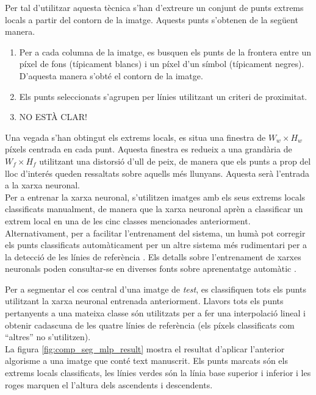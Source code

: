 Per tal d'utilitzar aquesta tècnica s'han d'extreure un conjunt de punts extrems locals a partir del contorn de la imatge. Aquests punts s'obtenen de la següent manera.
\begin{enumerate}
\item Per a cada columna de la imatge, es busquen els punts de la frontera entre un píxel de fons (típicament blancs) i un píxel d'un símbol (típicament negres). D'aquesta manera s'obté el contorn de la imatge.
\item Els punts seleccionats s'agrupen per línies utilitzant un criteri de proximitat.
\item NO ESTÀ CLAR!
\end{enumerate}

Una vegada s'han obtingut els extrems locals, es situa una finestra de $W_w \times H_w$ píxels centrada en cada punt. Aquesta finestra es redueix a una grandària de $W_f \times H_f$ utilitzant una distorsió d'ull de peix, de manera que els punts a prop del lloc d'interés queden ressaltats sobre aquells més llunyans. Aquesta serà l'entrada a la xarxa neuronal.\\

Per a entrenar la xarxa neuronal, s'utilitzen imatges amb els seus extrems locals classificats manualment, de manera que la xarxa neuronal aprèn a classificar un extrem local en una de les cinc classes mencionades anteriorment. Alternativament, per a facilitar l'entrenament del sistema, un humà pot corregir els punts classificats automàticament per un altre sistema més rudimentari per a la detecció de les línies de referència \cite{DBLP:conf/pris/Gorbe-MoyaEZB08}. Els detalls sobre l'entrenament de xarxes neuronals poden consultar-se en diverses fonts sobre aprenentatge automàtic \cite{DH73,bishop2006pattern,murphy2012machine}.

Per a segmentar el cos central d'una imatge de \emph{test}, es classifiquen tots els punts utilitzant la xarxa neuronal entrenada anteriorment. Llavors tots els punts pertanyents a una mateixa classe són utilitzats per a fer una interpolació lineal i obtenir cadascuna de les quatre línies de referència (els píxels classificats com ``altres'' no s'utilitzen).\\

La figura \ref{fig:comp_seg_mlp_result} mostra el resultat d'aplicar l'anterior algorisme a una imatge que conté text manuscrit. Els punts marcats són els extrems locals classificats, les línies verdes són la línia base superior i inferior i les roges marquen el l'altura dels ascendents i descendents.\\


